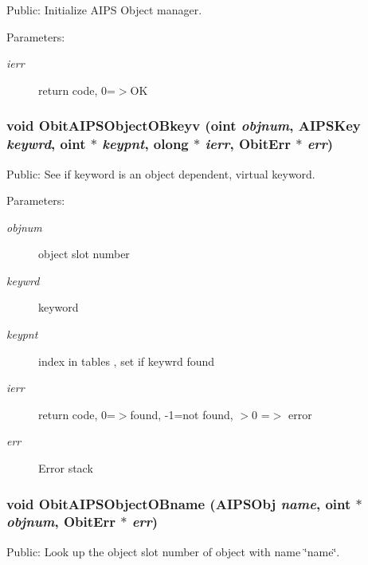 Public: Initialize AIPS Object manager. 

\begin{Desc}
\item[Parameters:]
\begin{description}
\item[{\em ierr}]return code, 0=$>$OK \end{description}
\end{Desc}
\subsubsection{\setlength{\rightskip}{0pt plus 5cm}void Obit\-AIPSObject\-OBkeyv ({\bf oint} {\em objnum}, {\bf AIPSKey} {\em keywrd}, {\bf oint} $\ast$ {\em keypnt}, {\bf olong} $\ast$ {\em ierr}, {\bf Obit\-Err} $\ast$ {\em err})}\label{ObitAIPSObject_8c_a24}


Public: See if keyword is an object dependent, virtual keyword. 

\begin{Desc}
\item[Parameters:]
\begin{description}
\item[{\em objnum}]object slot number \item[{\em keywrd}]keyword \item[{\em keypnt}]index in tables , set if keywrd found \item[{\em ierr}]return code, 0=$>$found, -1=not found, $>$0 =$>$ error \item[{\em err}]Error stack \end{description}
\end{Desc}
\subsubsection{\setlength{\rightskip}{0pt plus 5cm}void Obit\-AIPSObject\-OBname ({\bf AIPSObj} {\em name}, {\bf oint} $\ast$ {\em objnum}, {\bf Obit\-Err} $\ast$ {\em err})}\label{ObitAIPSObject_8c_a29}


Public: Look up the object slot number of object with name \char`\"{}name\char`\"{}. 

